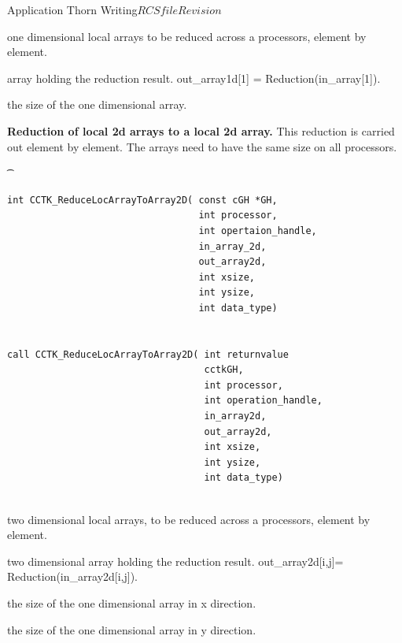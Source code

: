 \begin{cactuspart}{Application Thorn Writing}{$RCSfile$}{$Revision$}
\begin{Lentry}
\item[\texttt{in\_array1d}] one dimensional local arrays to be reduced across a 
processors, element by element. 
\item[\texttt{out\_array1d}] array holding the reduction result. out\_array1d[1]
= Reduction(in\_array[1]).
\item[\texttt{xsize}] the size of the one dimensional array.
\end{Lentry}

\vskip 0.25cm

{\bf Reduction of local 2d arrays to a local 2d array.} This reduction is carried
out element by element. The arrays need to have the same size on all
processors.
{\t
\begin{verbatim}
int CCTK_ReduceLocArrayToArray2D( const cGH *GH,
                                  int processor,
                                  int opertaion_handle,
                                  in_array_2d,
                                  out_array2d,
                                  int xsize,
                                  int ysize,
                                  int data_type)
                                 

call CCTK_ReduceLocArrayToArray2D( int returnvalue
                                   cctkGH,
                                   int processor,
                                   int operation_handle,
                                   in_array2d,
                                   out_array2d,
                                   int xsize,
                                   int ysize,
                                   int data_type)
                                 
\end{verbatim}
}

\begin{Lentry}
\item[\texttt{in\_array1d}] two dimensional local arrays, to be reduced across a 
processors, element by element. 
\item[\texttt{out\_array1d}] two dimensional array holding the reduction
result. out\_array2d[i,j]= Reduction(in\_array2d[i,j]).
\item[\texttt{xsize}] the size of the one dimensional array in x direction.
\item[\texttt{ysize}] the size of the one dimensional array in y direction.
\end{Lentry}


\end{cactuspart}
